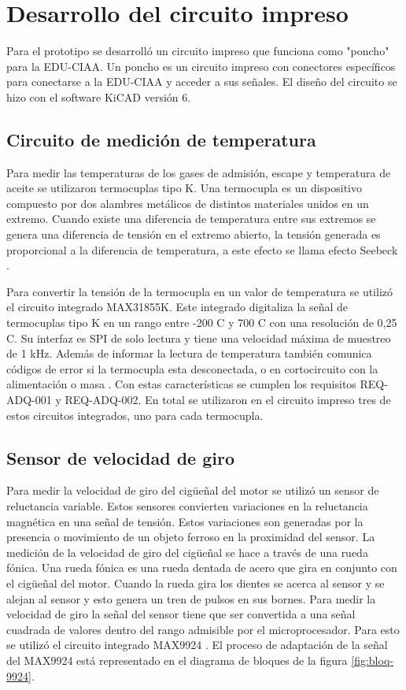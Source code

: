 \section{Desarrollo del circuito impreso} \label{circuito}

Para el prototipo se desarrolló un circuito impreso que funciona como "poncho" para la EDU-CIAA. Un poncho es un circuito impreso con conectores específicos para conectarse a la EDU-CIAA y acceder a sus señales. El diseño del circuito se hizo con el software KiCAD versión 6.

\subsection{Circuito de medición de temperatura}

Para medir las temperaturas de los gases de admisión, escape y temperatura de aceite se utilizaron termocuplas tipo K. Una termocupla es un dispositivo compuesto por dos alambres metálicos de distintos materiales unidos en un extremo. Cuando existe una diferencia de temperatura entre sus extremos se genera una diferencia de tensión en el extremo abierto, la tensión generada es proporcional a la diferencia de temperatura, a este efecto se llama efecto Seebeck \cite{termocupla}.

Para convertir la tensión de la termocupla en un valor de temperatura se utilizó el circuito integrado MAX31855K. Este integrado digitaliza la señal de termocuplas tipo K en un rango entre -200 \degree C y 700 \degree C con una resolución de 0,25 \degree C. Su interfaz es SPI de solo lectura y tiene una velocidad máxima de muestreo de 1 kHz. Además de informar la lectura de temperatura también comunica códigos de error si la termocupla esta desconectada, o en cortocircuito con la alimentación o masa \cite{MAX31855}. Con estas características se cumplen los requisitos REQ-ADQ-001 y REQ-ADQ-002. En total se utilizaron en el circuito impreso tres de estos circuitos integrados, uno para cada termocupla.

\subsection{Sensor de velocidad de giro}

Para medir la velocidad de giro del cigüeñal del motor se utilizó un sensor de reluctancia variable. Estos sensores convierten variaciones en la reluctancia magnética en una señal de tensión. Estos variaciones son generadas por la presencia o movimiento de un objeto ferroso en la proximidad del sensor. La medición de la velocidad de giro del cigüeñal se hace a través de una rueda fónica. Una rueda fónica es una rueda dentada de acero que gira en conjunto con el cigüeñal del motor. Cuando la rueda gira los dientes se acerca al sensor y se alejan al sensor y esto genera un tren de pulsos en sus bornes. Para medir la velocidad de giro la señal del sensor tiene que ser convertida a una señal cuadrada de valores dentro del rango admisible por el microprocesador. Para esto se utilizó el circuito integrado MAX9924 \cite{MAX9924}. El proceso de adaptación de la señal del MAX9924 está representado en el diagrama de bloques de la figura \ref{fig:bloq-9924}.

